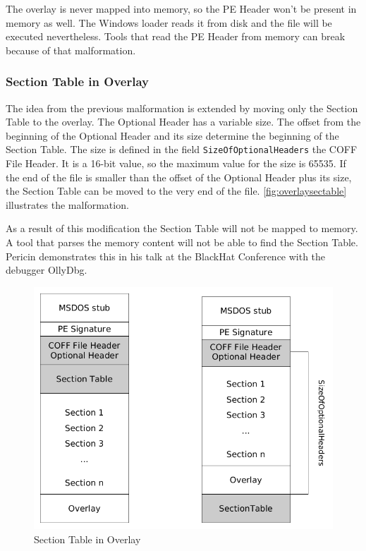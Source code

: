 The overlay is never mapped into memory, so the PE Header won't be present in memory as well. The Windows loader reads it from disk and the file will be executed nevertheless. Tools that read the PE Header from memory can break because of that malformation.

\subsubsection*{Section Table in Overlay}

The idea from the previous malformation is extended by moving only the Section Table to the overlay. The Optional Header has a variable size. The offset from the beginning of the Optional Header and its size determine the beginning of the Section Table. The size is defined in the field \texttt{SizeOfOptionalHeaders} the COFF File Header. It is a 16-bit value, so the maximum value for the size is 65535. If the end of the file is smaller than the offset of the Optional Header plus its size, the Section Table can be moved to the very end of the file. \autoref{fig:overlaysectable} illustrates the malformation.

As a result of this modification the Section Table will not be mapped to memory. A tool that parses the memory content will not be able to find the Section Table. Pericin demonstrates this in his talk at the BlackHat Conference with the debugger OllyDbg. \cite[min.\thinspace{}14:45]{vuksan11} 

\begin{figure}
\includegraphics[width=.98\textwidth, height=.60\textheight,keepaspectratio]{graphics/overlaysectable}
\caption{Section Table in Overlay }
\label{fig:overlaysectable} 
\end{figure}

